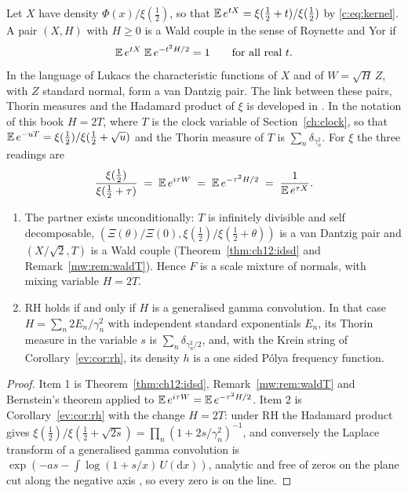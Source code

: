 Let $X$ have density $\Phi(x)/\xi(\frac12)$, so that $\mathbb{E}\,e^{tX}=\xi(\frac12+t)/\xi(\frac12)$ by \eqref{c:eq:kernel}. A pair $(X,H)$ with $H\ge0$ is a Wald couple in the sense of Roynette and Yor \cite{RoynetteYor05} if
\[
\mathbb{E}\,e^{tX}\;\mathbb{E}\,e^{-t^2H/2}=1\qquad\text{for all real }t .
\]
In the language of Lukacs \cite{Lukacs68} the characteristic functions of $X$ and of $W=\sqrt H\,Z$, with $Z$ standard normal, form a van Dantzig pair. The link between these pairs, Thorin measures and the Hadamard product of $\xi$ is developed in \cite{P18}. In the notation of this book $H=2T$, where $T$ is the clock variable of Section~\ref{ch:clock}, so that $\mathbb{E}\,e^{-uT}=\xi(\frac12)/\xi(\frac12+\sqrt u)$ and the Thorin measure of $T$ is $\sum_n\delta_{\gamma_n^2}$. For $\xi$ the three readings are
\[
\frac{\xi(\frac12)}{\xi(\frac12+\tau)}\;=\;\mathbb{E}\,e^{i\tau W}\;=\;\mathbb{E}\,e^{-\tau^2H/2}\;=\;\frac1{\mathbb{E}\,e^{\tau X}} .
\]

\begin{proposition}\label{c:thm:wald}
\begin{enumerate}
\item The partner exists unconditionally: $T$ is infinitely divisible and self decomposable, $(\Xi(\theta)/\Xi(0),\xi(\frac12)/\xi(\frac12+\theta))$ is a van Dantzig pair and $(X/\sqrt2,T)$ is a Wald couple (Theorem~\ref{thm:ch12:idsd} and Remark~\ref{mw:rem:waldT}). Hence $F$ is a scale mixture of normals, with mixing variable $H=2T$.
\item RH holds if and only if $H$ is a generalised gamma convolution. In that case $H=\sum_n2E_n/\gamma_n^2$ with independent standard exponentials $E_n$, its Thorin measure in the variable $s$ is $\sum_n\delta_{\gamma_n^2/2}$, and, with the Krein string of Corollary~\ref{ev:cor:rh}, its density $h$ is a one sided P\'olya frequency function.
\end{enumerate}
\end{proposition}

\begin{proof}
Item 1 is Theorem~\ref{thm:ch12:idsd}, Remark~\ref{mw:rem:waldT} and Bernstein's theorem applied to $\mathbb{E}\,e^{i\tau W}=\mathbb{E}\,e^{-\tau^2H/2}$. Item 2 is Corollary~\ref{ev:cor:rh} with the change $H=2T$: under RH the Hadamard product gives $\xi(\frac12)/\xi(\frac12+\sqrt{2s})=\prod_n(1+2s/\gamma_n^2)^{-1}$, and conversely the Laplace transform of a generalised gamma convolution is $\exp(-as-\int\log(1+s/x)\,U(\mathrm dx))$, analytic and free of zeros on the plane cut along the negative axis \cite{Bondesson}, so every zero is on the line.
\end{proof}

